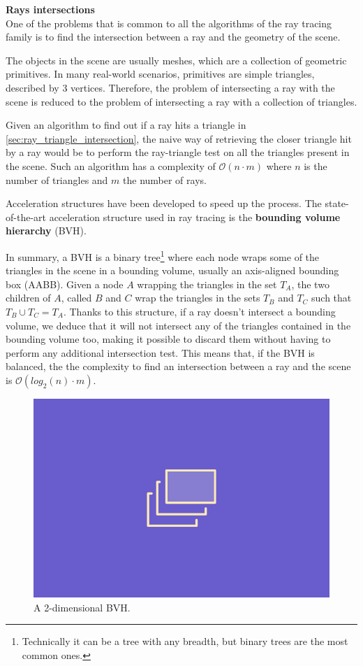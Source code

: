 \documentclass{PoliMi_MasterThesis}
\begin{document}
\large \textbf{Rays intersections} \normalsize\\
One of the problems that is common to all the algorithms of the ray tracing family is to find the intersection between a ray and the geometry of the scene.

The objects in the scene are usually meshes, which are a collection of geometric primitives. In many real-world scenarios, primitives are simple triangles, described by 3 vertices. Therefore, the problem of intersecting a ray with the scene is reduced to the problem of intersecting a ray with a collection of triangles.

Given an algorithm to find out if a ray hits a triangle in \ref{sec:ray_triangle_intersection}, the naive way of retrieving the closer triangle hit by a ray would be to perform the ray-triangle test on all the triangles present in the scene. Such an algorithm has a complexity of $\mathcal{O}(n\cdot m)$ where $n$ is the number of triangles and $m$ the number of rays.

Acceleration structures have been developed to speed up the process. The state-of-the-art acceleration structure used in ray tracing is the \textbf{bounding volume hierarchy} (BVH).

In summary, a BVH is a binary tree\footnote{Technically it can be a tree with any breadth, but binary trees are the most common ones.} where each node wraps some of the triangles in the scene in a bounding volume, usually an axis-aligned bounding box (AABB). Given a node $A$ wrapping the triangles in the set $T_A$, the two children of $A$, called $B$ and $C$ wrap the triangles in the sets $T_B$ and $T_C$ such that $T_B \cup T_C = T_A$. Thanks to this structure, if a ray doesn't intersect a bounding volume, we deduce that it will not intersect any of the triangles contained in the bounding volume too, making it possible to discard them without having to perform any additional intersection test. This means that, if the BVH is balanced, the the complexity to find an intersection between a ray and the scene is $\mathcal{O}(log_2(n) \cdot m)$.

\begin{figure}[H]
    \centering
    \includegraphics[scale=0.4]{Images/TODO.png}
    \caption{A 2-dimensional BVH.}
    \label{fig:bvh_2d}
\end{figure}
\end{document}
